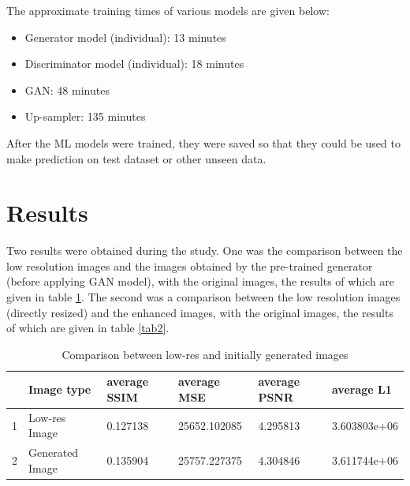 \documentclass[conference]{IEEEtran}
\begin{document}
		The approximate training times of various models are given below:
		\begin{itemize}
			\item Generator model (individual): 13 minutes
			\item Discriminator model (individual): 18 minutes
			\item GAN: 48 minutes
			\item Up-sampler: 135 minutes
		\end{itemize}
	
		After the ML models were trained, they were saved so that they could be used to make prediction on test dataset or other unseen data.
		
	\section{Results}
		Two results were obtained during the study. One was the comparison between the low resolution images and the images obtained by the pre-trained generator (before applying GAN model), with the original images, the results of which are given in table \ref{tab1}. The second was a comparison between the low resolution images (directly resized) and the enhanced images, with the original images, the results of which are given in table \ref{tab2}.
		
		\begin{table}[htbp]
			\caption{Comparison between low-res and initially generated images}
			\begin{center}
					\begin{tabular}{| p{0.2cm}| p{2cm}| p{1.2cm}|p{1.5cm}|p{1.2cm}|p{1.5cm}|}

						\hline

						 & Image type      & average SSIM & average MSE  & average PSNR & average L1 \\ \hline

						1      & Low-res Image     & 0.127138     & 25652.102085 & 4.295813     & 3.603803e+06     \\ \hline

						2      & Generated Image & 0.135904     & 25757.227375 & 4.304846     & 3.611744e+06     \\ \hline
 

					\end{tabular}
				\label{tab1}
			\end{center}
		\end{table}
		
\end{document}
